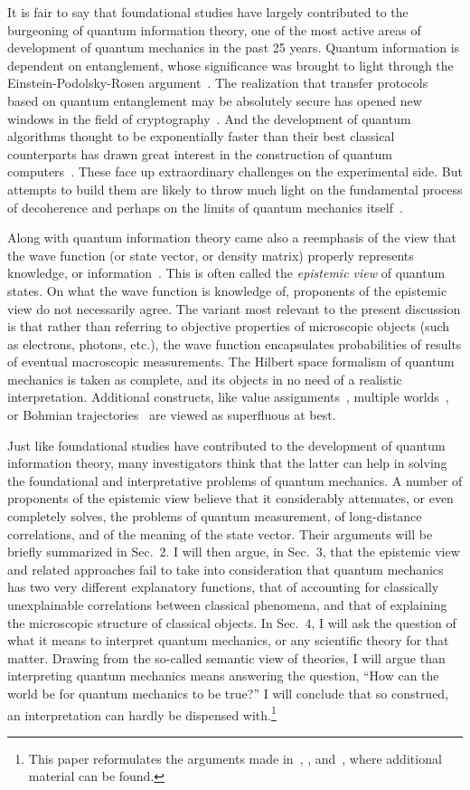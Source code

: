 \documentclass[12pt]{article}
\begin{document}
It is fair to say that foundational studies have
largely contributed to the burgeoning of quantum
information theory, one of the most active areas of
development of quantum mechanics in the past 25 years.
Quantum information is dependent on entanglement,
whose significance was brought to light through the
Einstein-Podolsky-Rosen argument~\cite{einstein}.  The
realization that transfer protocols based
on quantum entanglement may be absolutely
secure has opened new windows in the field of
cryptography~\cite{bennett}.  And the development
of quantum algorithms thought to be exponentially
faster than their best classical counterparts has
drawn great interest in the construction of quantum
computers~\cite{shor}.  These face up extraordinary
challenges on the experimental side.
But attempts to build them are likely to throw
much light on the fundamental process of
decoherence and perhaps on the limits of quantum mechanics
itself~\cite{hooft,leggett}.

Along with quantum information theory came also a reemphasis
of the view that the wave function (or state vector, or
density matrix) properly represents knowledge, or
information~\cite{rovelli,fuchs1,fuchs2}.
This is often called the \emph{epistemic view} of quantum states.
On what the wave function is knowledge of, proponents of
the epistemic view do not necessarily agree.
The variant most relevant to the present discussion is
that rather than referring to objective
properties of microscopic objects (such as
electrons, photons, etc.), the wave function
encapsulates probabilities of results of eventual macroscopic
measurements.  The Hilbert space formalism of quantum
mechanics is taken as complete, and its objects in
no need of a realistic interpretation.  Additional
constructs, like value assignments~\cite{vermaas},
multiple worlds~\cite{everett}, or Bohmian
trajectories~\cite{bohm} are viewed
as superfluous at best.

Just like foundational studies have contributed to
the development of quantum information theory,
many investigators think
that the latter can help in solving
the foundational and interpretative problems of
quantum mechanics.  A number of proponents of the epistemic
view believe that it considerably attenuates, or even completely
solves, the problems of quantum measurement, of
long-distance correlations, and of the meaning of the state
vector.  Their arguments will be briefly summarized in
Sec.~2.  I will then argue, in Sec.~3, that the epistemic
view and related approaches fail to take into consideration
that quantum mechanics has two very different explanatory
functions, that of accounting for classically unexplainable
correlations between classical phenomena, and that
of explaining the microscopic structure of classical objects.
In Sec.~4, I will ask the question of what it means to
interpret quantum mechanics, or any scientific theory for that
matter.  Drawing from the so-called semantic view of theories,
I will argue than interpreting quantum mechanics means
answering the question, ``How can the world be for quantum mechanics
to be true?''  I will conclude that so construed, an interpretation
can hardly be dispensed with.\footnote{This paper reformulates
the arguments made in~\cite{marchildon1}, \cite{marchildon2},
and~\cite{marchildon3}, where additional material can be found.}
% 
\end{document}
